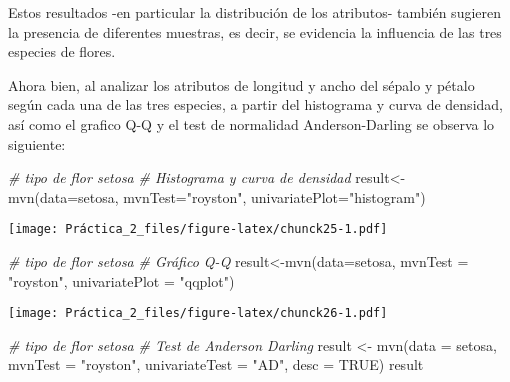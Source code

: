 \documentclass[
]{article}
\newenvironment{Shaded}{\begin{snugshade}}{\end{snugshade}}
\newcommand{\AttributeTok}[1]{\textcolor[rgb]{0.77,0.63,0.00}{#1}}
\newcommand{\CommentTok}[1]{\textcolor[rgb]{0.56,0.35,0.01}{\textit{#1}}}
\newcommand{\ConstantTok}[1]{\textcolor[rgb]{0.00,0.00,0.00}{#1}}
\newcommand{\FunctionTok}[1]{\textcolor[rgb]{0.00,0.00,0.00}{#1}}
\newcommand{\NormalTok}[1]{#1}
\newcommand{\OtherTok}[1]{\textcolor[rgb]{0.56,0.35,0.01}{#1}}
\newcommand{\StringTok}[1]{\textcolor[rgb]{0.31,0.60,0.02}{#1}}
\begin{document}
Estos resultados -en particular la distribución de los atributos-
también sugieren la presencia de diferentes muestras, es decir, se
evidencia la influencia de las tres especies de flores.

Ahora bien, al analizar los atributos de longitud y ancho del sépalo y
pétalo según cada una de las tres especies, a partir del histograma y
curva de densidad, así como el grafico Q-Q y el test de normalidad
Anderson-Darling se observa lo siguiente:

\begin{Shaded}
\begin{Highlighting}[]
\CommentTok{\# tipo de flor setosa}
\CommentTok{\# Histograma y curva de densidad}
\NormalTok{result}\OtherTok{\textless{}{-}} \FunctionTok{mvn}\NormalTok{(}\AttributeTok{data=}\NormalTok{setosa, }\AttributeTok{mvnTest=}\StringTok{"royston"}\NormalTok{, }\AttributeTok{univariatePlot=}\StringTok{"histogram"}\NormalTok{)}
\end{Highlighting}
\end{Shaded}

\texttt{[image: Práctica\_2\_files/figure-latex/chunck25-1.pdf]}

\begin{Shaded}
\begin{Highlighting}[]
\CommentTok{\# tipo de flor setosa}
\CommentTok{\# Gráfico Q{-}Q}
\NormalTok{result}\OtherTok{\textless{}{-}}\FunctionTok{mvn}\NormalTok{(}\AttributeTok{data=}\NormalTok{setosa, }\AttributeTok{mvnTest =} \StringTok{"royston"}\NormalTok{, }\AttributeTok{univariatePlot =} \StringTok{"qqplot"}\NormalTok{)}
\end{Highlighting}
\end{Shaded}

\texttt{[image: Práctica\_2\_files/figure-latex/chunck26-1.pdf]}

\begin{Shaded}
\begin{Highlighting}[]
\CommentTok{\# tipo de flor setosa}
\CommentTok{\# Test de Anderson Darling}
\NormalTok{result }\OtherTok{\textless{}{-}} \FunctionTok{mvn}\NormalTok{(}\AttributeTok{data =}\NormalTok{ setosa, }\AttributeTok{mvnTest =} \StringTok{"royston"}\NormalTok{, }\AttributeTok{univariateTest =} \StringTok{"AD"}\NormalTok{, }\AttributeTok{desc =} \ConstantTok{TRUE}\NormalTok{)}
\NormalTok{result}
\end{Highlighting}
\end{Shaded}
\end{document}
